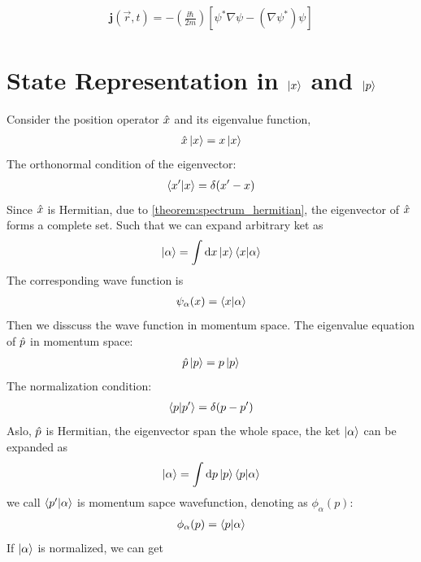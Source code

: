 \begin{align}
    \mathbf{j}(\vec{r},t) = - \left(\frac{\ii \hbar}{2m}\right) \left[\psi^* \nabla \psi - \left(\nabla \psi^*\right)\psi\right] \label{eq:probability_current}
\end{align}

\section{\texorpdfstring{State Representation in $\ket{x}$ and $\ket{p}$}{State Representation in x and p}} \label{sec:representation_xp}
Consider the position operator $\hat{x}$ and its eigenvalue function, 
\begin{eqnarray}
    \hat{x} \ket{x} = x \ket{x}
\end{eqnarray}
The orthonormal condition of the eigenvector: 
\begin{eqnarray}
    \braket{x'|x} = \delta(x'-x)
\end{eqnarray}
Since $\hat{x}$ is Hermitian, due to \cref{theorem:spectrum_hermitian}, the eigenvector of $\hat{x}$ forms a complete set. Such that we can expand arbitrary ket as 
\begin{align}
    \ket{\alpha} = \int \mathrm{d} x \ket{x} \braket{x|\alpha} \label{eq:ket_expansion_position}
\end{align}
The corresponding wave function is 
\begin{align}
    \psi_ \alpha (x) = \braket{x|\alpha} \label{eq:wavefunction_xalpha}
\end{align}
Then we disscuss the wave function in momentum space. The eigenvalue equation of $\hat{p}$ in momentum space: 
\begin{align}
    \hat{p} \ket{p} = p \ket{p} \label{eq:eigenvalue_momentum}
\end{align}
The normalization condition: 
\begin{eqnarray}
    \braket{p|p'} = \delta(p - p')
\end{eqnarray}
Aslo, $\hat{p}$ is Hermitian, the eigenvector span the whole space, the ket $\ket{\alpha}$ can be expanded as 
\begin{align}
    \ket{\alpha} = \int \mathrm{d} p \ket{p} \braket{p|\alpha} \label{eq:ket_expansion_momentum}
\end{align}
we call $\braket{p'|\alpha}$ is momentum sapce wavefunction, denoting as $\phi_ \alpha(p)$: 
\begin{align}
    \phi_ \alpha(p) = \braket{p|\alpha} \label{eq:wavefunction_palpha}
\end{align}
If $\ket{\alpha}$ is normalized, we can get 

